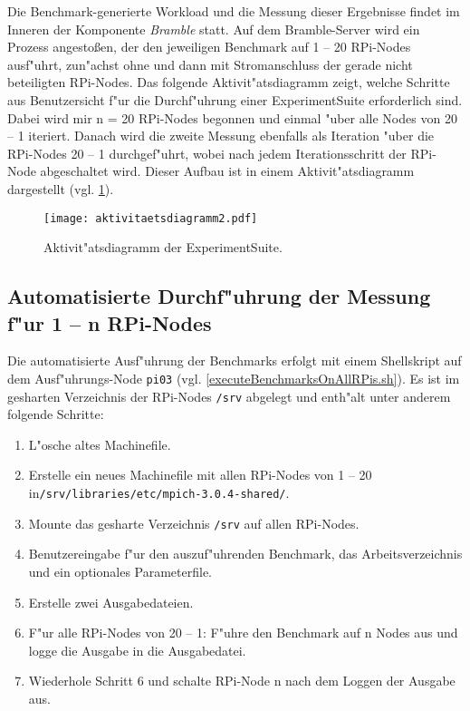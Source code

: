 Die Benchmark-generierte Workload und die Messung dieser Ergebnisse findet im Inneren der Komponente \textit{Bramble} statt. Auf dem Bramble-Server wird ein Prozess angesto\ss en, der den jeweiligen Benchmark auf 1 -- 20 RPi-Nodes ausf"uhrt, zun"achst ohne und dann mit Stromanschluss der gerade nicht beteiligten RPi-Nodes. Das folgende Aktivit"atsdiagramm zeigt, welche Schritte aus Benutzersicht f"ur die Durchf"uhrung einer ExperimentSuite erforderlich sind. Dabei wird mir n = 20 RPi-Nodes begonnen und einmal "uber alle Nodes von 20 -- 1 iteriert. Danach wird die zweite Messung ebenfalls als Iteration "uber die RPi-Nodes 20 -- 1 durchgef"uhrt, wobei nach jedem Iterationsschritt der RPi-Node abgeschaltet wird. Dieser Aufbau ist in einem Aktivit"atsdiagramm dargestellt (vgl. \ref{fig:Aktivitaetsdiagramm}).  
\begin{figure}[htb]
  \centering
  \texttt{[image: aktivitaetsdiagramm2.pdf]}\\ 
  \caption{Aktivit"atsdiagramm der ExperimentSuite.}
  \label{fig:Aktivitaetsdiagramm}
\end{figure}

\subsection{Automatisierte Durchf"uhrung der Messung f"ur 1 -- n RPi-Nodes}

Die automatisierte Ausf"uhrung der Benchmarks erfolgt mit einem Shellskript auf dem Ausf"uhrungs-Node \texttt{pi03} (vgl. \ref{executeBenchmarksOnAllRPis.sh}). Es ist im gesharten Verzeichnis der RPi-Nodes \texttt{/srv} abgelegt und enth"alt unter anderem folgende Schritte: 
\begin{enumerate}
	\item L"osche altes Machinefile.
	\item Erstelle ein neues Machinefile mit allen RPi-Nodes von 1 -- 20 in\newline\texttt{/srv/libraries/etc/mpich-3.0.4-shared/}.
	\item Mounte das gesharte Verzeichnis \texttt{/srv} auf allen RPi-Nodes.
	\item Benutzereingabe f"ur den auszuf"uhrenden Benchmark, das Arbeitsverzeichnis und ein optionales Parameterfile. 
	\item Erstelle zwei Ausgabedateien. 
	\item F"ur alle RPi-Nodes von 20 -- 1: F"uhre den Benchmark auf n Nodes aus und logge die Ausgabe in die Ausgabedatei.
	\item Wiederhole Schritt 6 und schalte RPi-Node n nach dem Loggen der Ausgabe aus.  
\end{enumerate}

